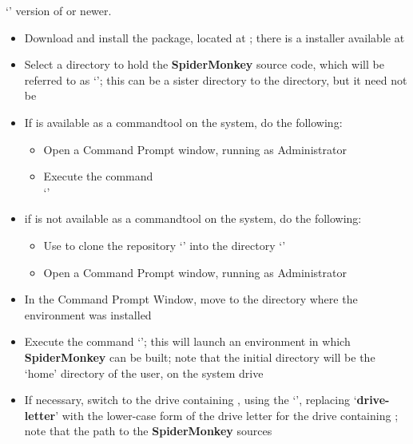 `' version of  or newer.
\begin{itemize}
\item Download and install the  package, located at
;
there is a \win{} installer available at\\
\item\exSp{}Select a directory to hold the \textbf{SpiderMonkey} source code, which will
be referred to as `'; this can be a sister directory to the
 directory, but it need not be
\item\exSp{}If  is available as a command\longDash{}tool on the system, do the
following:
\begin{itemize}
\item Open a Command Prompt window, running as Administrator
\item\exSp{}Execute the command\\
`'
\end{itemize}
\item\exSp{}if  is not available as a command\longDash{}tool on the system, do
the following:
\begin{itemize}
\item\exSp{}Use  to clone the repository
`' into the directory
`'
\item\exSp{}Open a Command Prompt window, running as Administrator
\end{itemize}
\item\exSp{}In the Command Prompt Window, move to the directory where the
 environment was installed
\item\exSp{}Execute the command `'; this will launch
an environment in which \textbf{SpiderMonkey} can be built; note that the initial
directory will be the `home' directory of the user, on the system drive
\item\exSp{}If necessary, switch to the drive containing ,
using the `', replacing `\textbf{drive-letter}' with
the lower-case form of the drive letter for the drive containing
; note that the path to the \textbf{SpiderMonkey} sources

\end{itemize}

